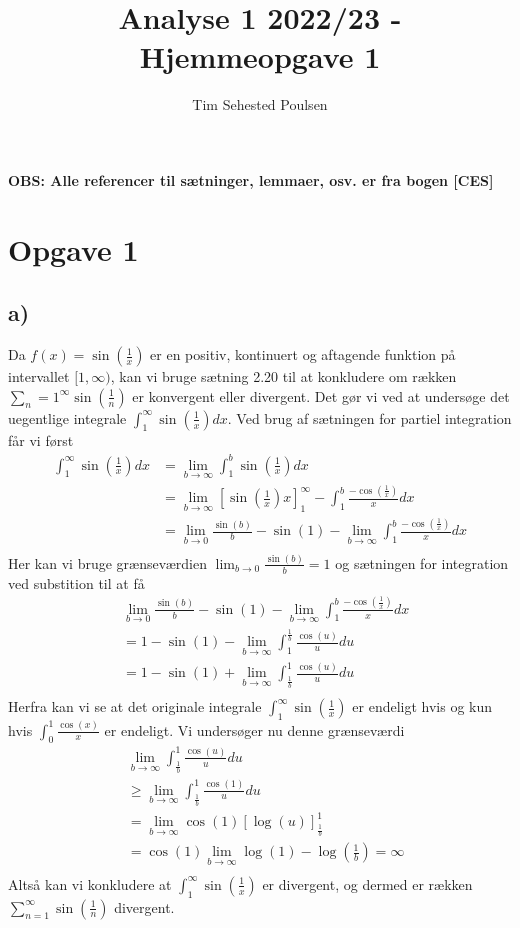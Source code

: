 \documentclass{article}
\title{Analyse 1 2022/23 - Hjemmeopgave 1}
\author{Tim Sehested Poulsen}
\newcommand{\lrb}[1]{\left[ #1\right]}
\begin{document}
\textbf{OBS: Alle referencer til sætninger, lemmaer, osv. er fra bogen [CES]}
\section*{Opgave 1}
\subsection*{a)}
Da $f(x) = \sin(\frac{1}{x})$ er en positiv, kontinuert og aftagende 
funktion på intervallet $[1, \infty)$, kan vi bruge sætning 2.20 til at 
konkludere om rækken $\sum_n=1^\infty \sin(\frac{1}{n})$ er konvergent eller divergent.
Det gør vi ved at undersøge det uegentlige integrale $\int_1^\infty \sin(\frac{1}{x}) dx$. 
Ved brug af sætningen for partiel integration\cite[sætning 5.35]{an0} får vi først
\begin{align*}
    \int_1^\infty \sin(\frac{1}{x}) dx &= \lim_{b \to \infty} \int_1^b \sin(\frac{1}{x}) dx \\
    &= \lim_{b \to \infty} \lrb{\sin(\frac{1}{x})x}_1^{\infty} - \int_1^b \frac{-\cos(\frac{1}{x})}{x} dx \\ 
    &= \lim_{b \to 0} \frac{\sin(b)}{b} - \sin(1) - \lim_{b \to \infty}\int_1^b \frac{-\cos(\frac{1}{x})}{x} dx \\ 
\end{align*}
Her kan vi bruge grænseværdien $\lim_{b \to 0} \frac{\sin(b)}{b} = 1$
og sætningen for integration ved substition\cite[sætning 5.39]{an0} til at få
\begin{align*}
    &\lim_{b \to 0} \frac{\sin(b)}{b} - \sin(1) - \lim_{b \to \infty}\int_1^b \frac{-\cos(\frac{1}{x})}{x} dx \\ 
    &= 1 - \sin(1) -  \lim_{b \to \infty} \int_1^{\frac{1}{b}} \frac{\cos(u)}{u} du \\ 
    &= 1 - \sin(1) +  \lim_{b \to \infty} \int_{\frac{1}{b}}^1 \frac{\cos(u)}{u} du \\
\end{align*}
Herfra kan vi se at det originale integrale $\int_1^{\infty} \sin(\frac{1}{x})$ 
er endeligt hvis og kun hvis
$\int_0^1{\frac{\cos(x)}{x}}$ er endeligt. Vi undersøger nu denne grænseværdi
\begin{align*}
&\lim_{b \to \infty} \int_{\frac{1}{b}}^1 \frac{\cos(u)}{u} du \\
&\ge \lim_{b \to \infty} \int_{\frac{1}{b}}^1 \frac{\cos(1)}{u} du \\
&= \lim_{b \to \infty} \cos(1) \lrb{\log(u)}_{\frac{1}{b}}^1 \\
&= \cos(1) \lim_{b \to \infty} \log(1) - \log(\frac{1}{b}) = \infty \\
\end{align*}
Altså kan vi konkludere at $\int_1^{\infty} \sin(\frac{1}{x})$ er divergent, og dermed
er rækken $\sum_{n=1}^{\infty} \sin(\frac{1}{n})$ divergent.
\end{document}
